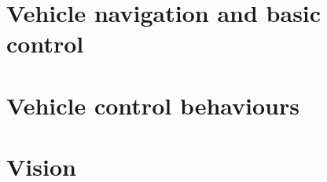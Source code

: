 \documentclass[10pt]{article}
\begin{document}
\maketitle

\tableofcontents

\section{Vehicle navigation and basic control}
















\section{Vehicle control behaviours}





\section{Vision}


\end{document}
